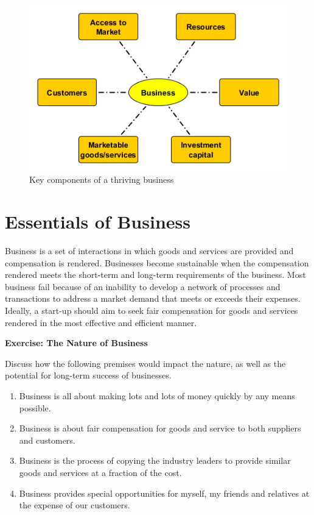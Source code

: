 \documentclass[]{book}
\providecommand{\tightlist}{%
  \setlength{\itemsep}{0pt}\setlength{\parskip}{0pt}}
\let\BeginKnitrBlock\begin \let\EndKnitrBlock\end
\begin{document}
\begin{figure}
\centering
\includegraphics{images/keycomponents.png}
\caption{Key components of a thriving business}
\end{figure}

\hypertarget{essentials-of-business}{%
\section{Essentials of Business}\label{essentials-of-business}}

Business is a set of interactions in which goods and services are provided and compensation is rendered. Businesses become sustainable when the compensation rendered meets the short-term and long-term requirements of the business. Most business fail because of an inability to develop a network of processes and transactions to address a market demand that meets or exceeds their expenses. Ideally, a start-up should aim to seek fair compensation for goods and services rendered in the most effective and efficient manner.

\BeginKnitrBlock{rmdexercise}
\textbf{Exercise: The Nature of Business}

Discuss how the following premises would impact the nature, as well as the potential for long-term success of businesses.

\begin{enumerate}
\def\labelenumi{\arabic{enumi}.}
\tightlist
\item
  Business is all about making lots and lots of money quickly by any means possible.
\item
  Business is about fair compensation for goods and service to both suppliers and customers.
\item
  Business is the process of copying the industry leaders to provide similar goods and services at a fraction of the cost.
\item
  Business provides special opportunities for myself, my friends and relatives at the expense of our customers.
\end{enumerate}
\EndKnitrBlock{rmdexercise}
\end{document}
